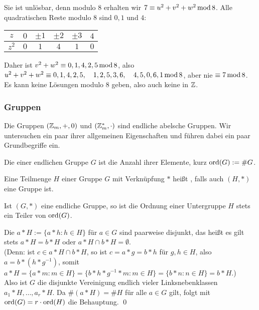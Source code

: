 \begin{itemize}
		Sie ist unlösbar, denn modulo $8$ erhalten wir $7 \equiv u^2 + v^2 + w^2 \operatorname{mod} 8$. 
		Alle quadratischen Reste modulo $8$ sind $0, 1$ und $4$:
		\begin{center}
			\begin{tabular}{c||c|c|c|c|c}
			$z$ & $0$ & $\pm 1$ & $\pm 2$ & $\pm 3$ & $4$ \\ 
			\hline $z^2$ & $0$ & $1$ & $4$ & $1$ & $0$ \\ 
			\end{tabular} 
		\end{center}
		Daher ist $v^2 + w^2 \equiv 0,1,4,2,5 \operatorname{mod} 8$, also $u^2+v^2+w^2 \equiv 0,1,4,2,5, \quad 1,2,5,3,6, \quad 4,5,0,6,1 \operatorname{mod} 8$, aber nie $\equiv 7 \operatorname{mod} 8$. 
		Es kann keine Lösungen modulo $8$ geben, also auch keine in $\mathbb{Z}$.
	\end{itemize}

\nextlecture
\subsubsection{Gruppen}
\label{subsub:1.1.3}
	Die Gruppen $(\mathbb{Z}_m,+,0)$ und $(\mathbb{Z}_m^*,\cdot)$ sind endliche abelsche Gruppen.\marginnote{[4]} Wir untersuchen ein paar ihrer allgemeinen Eigenschaften und führen dabei ein paar Grundbegriffe ein.
	
\begin{defn}[Gruppenordnung]
	Die  einer endlichen Gruppe $G$ ist die Anzahl ihrer Elemente, kurz $\operatorname{ord}(G) := \#G$.
\end{defn}

\begin{defn}[Untergruppe]
	Eine Teilmenge $H$ einer Gruppe $G$ mit Verknüpfung $*$ heißt , falls auch $(H,*)$ eine Gruppe ist.
\end{defn}

\begin{satz}
\label{satz_lagrange}
	Ist $(G,*)$ eine endliche Gruppe, so ist die Ordnung einer Untergruppe $H$ stets ein Teiler von $\operatorname{ord}(G)$. 
\end{satz}

	Die  $a*H := \{ a * h : h \in H\}$ für $a \in G$ sind paarweise disjunkt, das heißt es gilt stets $a * H = b * H$ oder $a * H \cap b * H = \emptyset$. \\
	(Denn: ist $c \in a * H \cap b * H$, so ist $c = a * g = b * h$ für $g,h \in H$, also $a = b * (h * g^{-1})$, somit $a*H = \{a * m : m \in H\} = \{b * h * g^{-1} * m : m \in H\} = \{b * n : n \in H\} = b * H$.) \\
	Also ist $G$ die disjunkte Vereinigung endlich vieler Linksnebenklassen $a_1 * H, \dots, a_r * H$. 
	Da $\#(a*H) = \#H$ für alle $a \in G$ gilt, folgt mit $\operatorname{ord}(G) = r \cdot \operatorname{ord}(H)$ die Behauptung. \qed
	
